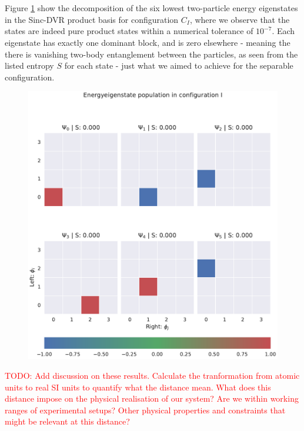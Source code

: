 \documentclass{subfiles}
\begin{document}
\\ \\ Figure \ref{fig:state_populations_I} show the decomposition of the six lowest two-particle energy eigenstates in the Sinc-DVR product basis for configuration $C_I$, where we observe that the states are indeed pure product states within a numerical tolerance of $10^{-7}$. Each eigenstate has exactly one dominant block, and is zero elsewhere - meaning the there is vanishing two-body entanglement between the particles, as seen from the listed entropy $S$ for each state - just what we aimed to achieve for the separable configuration. 
\begin{figure}[h!]
    \centering
    \includegraphics[width=1.0\textwidth]{figs/state_populations_I.pdf}
    \label{fig:state_populations_I}
\end{figure}
\textcolor{red}{TODO: Add discussion on these results. Calculate the tranformation from atomic units to real SI units to quantify what the distance mean. What does this distance impose on the physical realisation of our system? Are we within working ranges of experimental setups? Other physical properties and constraints that might be relevant at this distance?}

\\
\end{document}
